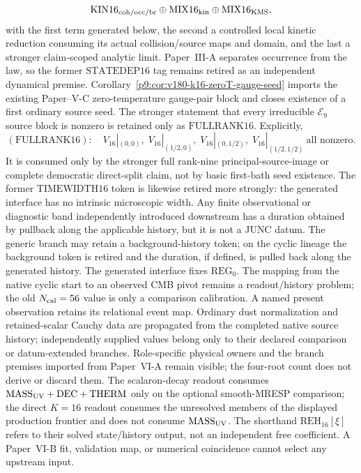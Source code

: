 \documentclass[12pt,a4paper]{article}
\begin{document}
\begin{remark}
\[
 \mathrm{KIN16}_{\rm coh/occ/br}\oplus
 \mathrm{MIX16}_{\rm kin}\oplus\mathrm{MIX16}_{\rm KMS},
\]
with the first term generated below, the second a controlled local kinetic
reduction consuming its actual collision/source maps and domain, and the last
a stronger claim-scoped analytic limit.  Paper~III-A separates occurrence from the law, so the former
\(\mathrm{STATEDEP16}\) tag remains retired as an independent dynamical premise.  Corollary~\ref{p9:cor:v180-k16-zeroT-gauge-seed} imports the existing
Paper--V-C zero-temperature gauge-pair block and closes existence of a first
ordinary source seed.  The stronger statement that every irreducible
\(\mathcal E_9\) source block is nonzero is retained only as
\(\mathrm{FULLRANK16}\).
Explicitly,
\[
 \boxed{
 (\mathrm{FULLRANK16}):\quad
 V_{16}|_{(0,0)},\;
 V_{16}|_{(1/2,0)},\;
 V_{16}|_{(0,1/2)},\;
 V_{16}|_{(1/2,1/2)}\ \text{all nonzero}.}
\]
It is consumed only by the stronger full rank-nine principal-source-image or
complete democratic direct-split claim, not by basic first-bath seed existence.  The former \(\mathrm{TIMEWIDTH16}\) token is likewise retired more strongly:
the generated interface has no intrinsic microscopic width.  Any finite
observational or diagnostic band independently introduced downstream has a
duration obtained by pullback along the applicable history, but it is not a
JUNC datum.  The generic branch may retain a background-history token; on the
cyclic lineage the background token is retired and the duration, if defined,
is pulled back along the generated history.
The generated interface fixes \(\mathrm{REG}_0\).  The mapping from the native cyclic start to an observed CMB pivot remains a
readout/history problem; the old \(N_{\rm cal}=56\) value is only a comparison
calibration.  A named present observation retains its relational event map.
Ordinary dust normalization and retained-scalar Cauchy data are propagated from
the completed native source history; independently supplied values belong only
to their declared comparison or datum-extended branches.  Role-specific physical owners and the
branch premises imported from Paper~VI-A remain visible; the four-root count
does not derive or discard them.  The scalaron-decay readout consumes
\(\mathrm{MASS}_{\rm UV}+\mathrm{DEC}+\mathrm{THERM}\) only on the optional
smooth-MRESP comparison; the direct
\(K=16\) readout consumes the unresolved members of the displayed
production frontier and does not consume \(\mathrm{MASS}_{\rm UV}\).
The shorthand \(\mathrm{REH}_{16}[\xi]\) refers to their solved
state/history output, not an independent free coefficient.  A Paper~VI-B fit, validation map, or numerical
coincidence cannot select any upstream input.
\end{remark}
\end{document}

